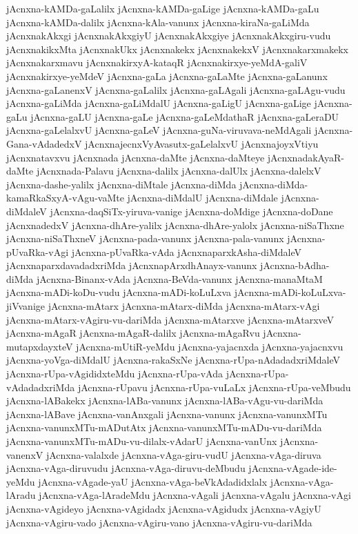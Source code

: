 {jAcnxna-kAMDa-gaLalilx
jAcnxna-kAMDa-gaLige
jAcnxna-kAMDa-gaLu
jAcnxna-kAMDa-dalilx
jAcnxna-kAla-vanunx
jAcnxna-kiraNa-gaLiMda
jAcnxnakAkxgi
jAcnxnakAkxgiyU
jAcnxnakAkxgiye
jAcnxnakAkxgiru-vudu
jAcnxnakikxMta
jAcnxnakUkx
jAcnxnakekx
jAcnxnakekxV
jAcnxnakarxmakekx
jAcnxnakarxmavu
jAcnxnakirxyA-kataqR
jAcnxnakirxye-yeMdA-galiV
jAcnxnakirxye-yeMdeV
jAcnxna-gaLa
jAcnxna-gaLaMte
jAcnxna-gaLanunx
jAcnxna-gaLanenxV
jAcnxna-gaLalilx
jAcnxna-gaLAgali
jAcnxna-gaLAgu-vudu
jAcnxna-gaLiMda
jAcnxna-gaLiMdalU
jAcnxna-gaLigU
jAcnxna-gaLige
jAcnxna-gaLu
jAcnxna-gaLU
jAcnxna-gaLe
jAcnxna-gaLeMdathaR
jAcnxna-gaLeraDU
jAcnxna-gaLelalxvU
jAcnxna-gaLeV
jAcnxna-guNa-viruvava-neMdAgali
jAcnxna-Gana-vAdadedxV
jAcnxnajecnxVyAvasutx-gaLelalxvU
jAcnxnajoyxVtiyu
jAcnxnatavxvu
jAcnxnada
jAcnxna-daMte
jAcnxna-daMteye
jAcnxnadakAyaR-daMte
jAcnxnada-Palavu
jAcnxna-dalilx
jAcnxna-dalUlx
jAcnxna-dalelxV
jAcnxna-dashe-yalilx
jAcnxna-diMtale
jAcnxna-diMda
jAcnxna-diMda-kamaRkaSxyA-vAgu-vaMte
jAcnxna-diMdalU
jAcnxna-diMdale
jAcnxna-diMdaleV
jAcnxna-daqSiTx-yiruva-vanige
jAcnxna-doMdige
jAcnxna-doDane
jAcnxnadedxV
jAcnxna-dhAre-yalilx
jAcnxna-dhAre-yalolx
jAcnxna-niSaThxne
jAcnxna-niSaThxneV
jAcnxna-pada-vanunx
jAcnxna-pala-vanunx
jAcnxna-pUvaRka-vAgi
jAcnxna-pUvaRka-vAda
jAcnxnaparxkAsha-diMdaleV
jAcnxnaparxdavadadxriMda
jAcnxnapArxdhAnayx-vanunx
jAcnxna-bAdha-diMda
jAcnxna-Binanx-vAda
jAcnxna-BeVda-vanunx
jAcnxna-manaMtaM
jAcnxna-mADi-koDu-vudu
jAcnxna-mADi-koLuLxva
jAcnxna-mADi-koLuLxva-jiVvanige
jAcnxna-mAtarx
jAcnxna-mAtarx-diMda
jAcnxna-mAtarx-vAgi
jAcnxna-mAtarx-vAgiru-vu-dariMda
jAcnxna-mAtarxve
jAcnxna-mAtarxveV
jAcnxna-mAgaR
jAcnxna-mAgaR-dalilx
jAcnxna-mAgaRvu
jAcnxna-mutapxdayxteV
jAcnxna-mUtiR-yeMdu
jAcnxna-yajacnxda
jAcnxna-yajacnxvu
jAcnxna-yoVga-diMdalU
jAcnxna-rakaSxNe
jAcnxna-rUpa-nAdadadxriMdaleV
jAcnxna-rUpa-vAgididxteMdu
jAcnxna-rUpa-vAda
jAcnxna-rUpa-vAdadadxriMda
jAcnxna-rUpavu
jAcnxna-rUpa-vuLaLx
jAcnxna-rUpa-veMbudu
jAcnxna-lABakekx
jAcnxna-lABa-vanunx
jAcnxna-lABa-vAgu-vu-dariMda
jAcnxna-lABave
jAcnxna-vanAnxgali
jAcnxna-vanunx
jAcnxna-vanunxMTu
jAcnxna-vanunxMTu-mADutAtx
jAcnxna-vanunxMTu-mADu-vu-dariMda
jAcnxna-vanunxMTu-mADu-vu-dilalx-vAdarU
jAcnxna-vanUnx
jAcnxna-vanenxV
jAcnxna-valalxde
jAcnxna-vAga-giru-vudU
jAcnxna-vAga-diruva
jAcnxna-vAga-diruvudu
jAcnxna-vAga-diruvu-deMbudu
jAcnxna-vAgade-ide-yeMdu
jAcnxna-vAgade-yaU
jAcnxna-vAga-beVkAdadidxlalx
jAcnxna-vAga-lAradu
jAcnxna-vAga-lAradeMdu
jAcnxna-vAgali
jAcnxna-vAgalu
jAcnxna-vAgi
jAcnxna-vAgideyo
jAcnxna-vAgidadx
jAcnxna-vAgidudx
jAcnxna-vAgiyU
jAcnxna-vAgiru-vado
jAcnxna-vAgiru-vano
jAcnxna-vAgiru-vu-dariMda
}
